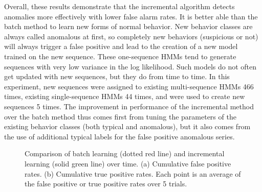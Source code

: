 Overall, these results demonstrate that the incremental algorithm
detects anomalies more effectively with lower false alarm rates.  It
is better able than the batch method to learn new forms of normal
behavior.  New behavior classes are always called anomalous at first,
so completely new behaviors (suspicious or not) will always trigger a
false positive and lead to the creation of a new model trained on the
new sequence.  These one-sequence HMMs tend to generate sequences with
very low variance in the log likelihood. Such models do not often get
updated with new sequences, but they do from time to time. In this
experiment, new sequences were assigned to existing multi-sequence
HMMs 466 times, existing single-sequence HMMs 44 times, and were used
to create new sequences 5 times.  The improvement in performance of
the incremental method over the batch method thus comes first from
tuning the parameters of the existing behavior classes (both typical
and anomalous), but it also comes from the use of additional typical
labels for the false positive anomalous series.

\begin{figure}[t]
  \centering
  \caption[Comparison of batch learning and incremental learning over
    time.]{\small Comparison of batch learning (dotted red line) and
    incremental learning (solid green line) over time.  (a) Cumulative
    false positive rates. (b) Cumulative true positive rates.  Each
    point is an average of the false positive or true positive rates
    over 5 trials.}
  \label{fig:chunking-results}
\end{figure}

